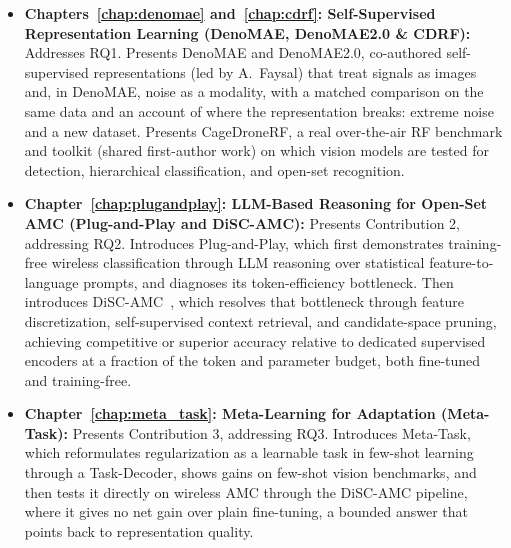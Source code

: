 \begin{itemize}
    \item 	\textbf{Chapters~\ref{chap:denomae} and~\ref{chap:cdrf}: Self-Supervised Representation Learning (DenoMAE, DenoMAE2.0 \& CDRF):} Addresses RQ1. Presents DenoMAE and DenoMAE2.0, co-authored self-supervised representations (led by A.~Faysal) that treat signals as images and, in DenoMAE, noise as a modality, with a matched comparison on the same data and an account of where the representation breaks: extreme noise and a new dataset. Presents CageDroneRF, a real over-the-air RF benchmark and toolkit (shared first-author work) on which vision models are tested for detection, hierarchical classification, and open-set recognition.


    \item \textbf{Chapter~\ref{chap:plugandplay}: LLM-Based Reasoning for Open-Set AMC (Plug-and-Play and DiSC-AMC):} Presents Contribution 2, addressing RQ2. Introduces Plug-and-Play, which first demonstrates training-free wireless classification through LLM reasoning over statistical feature-to-language prompts, and diagnoses its token-efficiency bottleneck. Then introduces DiSC-AMC~\cite{disc_amc}, which resolves that bottleneck through feature discretization, self-supervised context retrieval, and candidate-space pruning, achieving competitive or superior accuracy relative to dedicated supervised encoders at a fraction of the token and parameter budget, both fine-tuned and training-free.

    \item 	\textbf{Chapter~\ref{chap:meta_task}: Meta-Learning for Adaptation (Meta-Task):} Presents Contribution 3, addressing RQ3. Introduces Meta-Task, which reformulates regularization as a learnable task in few-shot learning through a Task-Decoder, shows gains on few-shot vision benchmarks, and then tests it directly on wireless AMC through the DiSC-AMC pipeline, where it gives no net gain over plain fine-tuning, a bounded answer that points back to representation quality.

    
    

\end{itemize}
